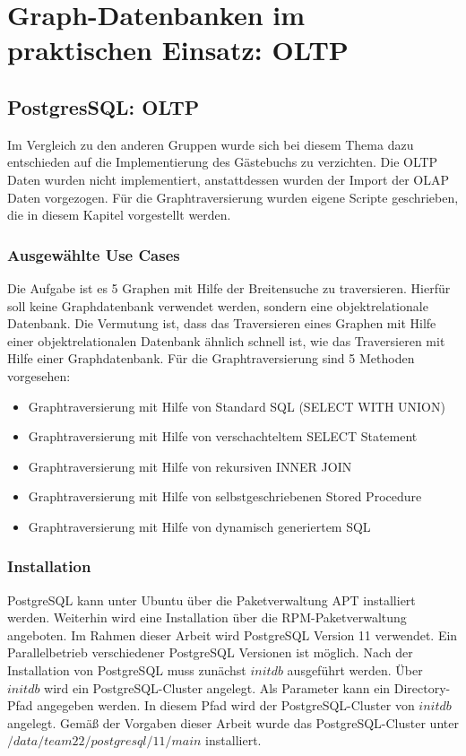 \chapter{Graph-Datenbanken im praktischen Einsatz: \ac{OLTP}}
\section{PostgresSQL: OLTP}
Im Vergleich zu den anderen Gruppen wurde sich bei diesem Thema dazu entschieden auf die Implementierung des Gästebuchs zu verzichten. Die OLTP Daten wurden nicht
implementiert, anstattdessen wurden der Import der OLAP Daten vorgezogen. Für die Graphtraversierung wurden eigene Scripte geschrieben, die in diesem Kapitel vorgestellt
werden.
\subsection{Ausgewählte Use Cases}
Die Aufgabe ist es 5 Graphen mit Hilfe der Breitensuche zu traversieren. Hierfür soll keine Graphdatenbank verwendet werden, sondern eine objektrelationale Datenbank.
Die Vermutung ist, dass das Traversieren eines Graphen mit Hilfe einer objektrelationalen Datenbank ähnlich schnell ist, wie das Traversieren mit Hilfe einer Graphdatenbank.
Für die Graphtraversierung sind 5 Methoden vorgesehen:
\begin{itemize}
    \item Graphtraversierung mit Hilfe von Standard \ac{SQL} (SELECT WITH UNION)
    \item Graphtraversierung mit Hilfe von verschachteltem SELECT Statement
    \item Graphtraversierung mit Hilfe von rekursiven INNER JOIN
    \item Graphtraversierung mit Hilfe von selbstgeschriebenen Stored Procedure
    \item Graphtraversierung mit Hilfe von dynamisch generiertem \ac{SQL}
\end{itemize}
\subsection{Installation}
PostgreSQL kann unter Ubuntu über die Paketverwaltung APT installiert werden. Weiterhin wird eine Installation über die RPM-Paketverwaltung angeboten. Im Rahmen dieser Arbeit wird PostgreSQL Version 11 verwendet. Ein Parallelbetrieb verschiedener PostgreSQL Versionen ist möglich. 
Nach der Installation von PostgreSQL muss zunächst $initdb$ ausgeführt werden. Über $initdb$ wird ein PostgreSQL-Cluster angelegt. Als Parameter kann ein Directory-Pfad angegeben werden. In diesem Pfad wird der PostgreSQL-Cluster von $initdb$ angelegt.
Gemäß der Vorgaben dieser Arbeit wurde das PostgreSQL-Cluster unter $/data/team22/postgresql/11/main$ installiert.
